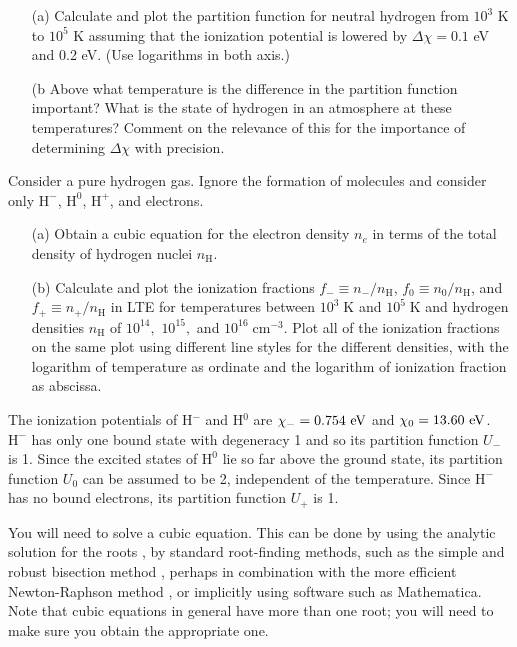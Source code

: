 \problemset

\begin{problem}
\begin{enumerate}
\item[(a)]
Calculate and plot the partition function for neutral hydrogen from
$10^3$ K to $10^5$ K assuming that the ionization potential is
lowered by $\Delta\chi = 0.1$ eV and 0.2 eV. (Use logarithms in both axis.)
\item[(b]
Above what temperature is the difference in the partition function important? What is the state of hydrogen in an atmosphere at these temperatures? Comment on the relevance of this for the importance of determining $\Delta\chi$ with precision.
\end{enumerate}
\end{problem}

\begin{problem}
Consider a pure hydrogen gas. Ignore the formation of molecules and consider only $\mathrm{H}^-$, $\mathrm{H}^0$, $\mathrm{H}^+$, and electrons.
\begin{enumerate}
\item[(a)]
Obtain a cubic equation for the electron density $n_e$ in terms of the total density of hydrogen nuclei $n_\mathrm{H}$.
\item[(b)]
Calculate and plot the ionization fractions $f_- \equiv n_-/n_\mathrm{H}$, $f_0 \equiv n_0/n_\mathrm{H}$, and $f_+\equiv n_+/n_\mathrm{H}$ in LTE for temperatures between $10^3\;\mathrm{K}$ and $10^5\;\mathrm{K}$ and hydrogen densities $n_\mathrm{H}$ of  $10^{14},$ $10^{15},$ and $10^{16}\;\mathrm{cm^{-3}}$. Plot all of the ionization fractions on the same plot using different line styles for the different densities, with the logarithm of temperature as ordinate and the logarithm of ionization fraction as abscissa.
\end{enumerate}

The ionization potentials of H$^-$ and H$^0$ are $\chi_- = 0.754~\mbox{eV}$ and $\chi_0 = 13.60~\mbox{eV}$. $\mathrm{H}^-$ has only one
bound state with degeneracy 1 and so its partition function $U_-$ is 1. Since the excited states of $\mathrm{H}^0$ lie so far above the
ground state, its partition function $U_0$ can be assumed to be 2,
independent of the temperature. Since $\mathrm{H}^-$ has no bound electrons, its partition function $U_+$ is 1.

You will need to solve a cubic equation. This can be done by using the analytic solution for the roots \cite[\S 5.6]{Press-1992}, by standard root-finding methods, such as the simple and robust bisection method \cite[\S9.1]{Press-1992}, perhaps in combination with the more efficient Newton-Raphson method \cite[\S9.4]{Press-1992}, or implicitly using software such as Mathematica. Note that cubic equations in general have more than one root; you will need to make sure you obtain the appropriate one.

\end{problem}


